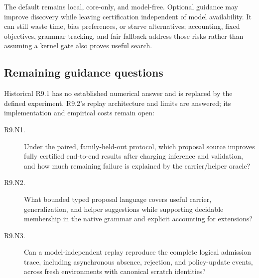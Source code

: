 The default remains local, core-only, and model-free. Optional guidance may improve discovery while leaving certification independent of model availability. It can still waste time, bias preferences, or starve alternatives; accounting, fixed objectives, grammar tracking, and fair fallback address those risks rather than assuming a kernel gate also proves useful search.

\subsection{Remaining guidance questions}\label{sec:learning-open}

Historical R9.1 has no established numerical answer and is replaced by the defined experiment. R9.2's replay architecture and limits are answered; its implementation and empirical costs remain open:
\begin{description}
\item[R9.N1.] Under the paired, family-held-out protocol, which proposal source improves fully certified end-to-end results after charging inference and validation, and how much remaining failure is explained by the carrier/helper oracle?
\item[R9.N2.] What bounded typed proposal language covers useful carrier, generalization, and helper suggestions while supporting decidable membership in the native grammar and explicit accounting for extensions?
\item[R9.N3.] Can a model-independent replay reproduce the complete logical admission trace, including asynchronous absence, rejection, and policy-update events, across fresh environments with canonical scratch identities?
\end{description}
